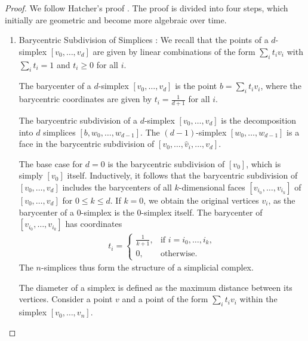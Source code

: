 \begin{proof}
	We follow Hatcher's proof \cite[Proposition 2.21]{hatcher2005algebraic}. The proof is divided into four steps, which initially are geometric and become more algebraic over time.
	
	\begin{enumerate}
	\item Barycentric Subdivision of Simplices \cite[\S 2.21 (1)]{hatcher2005algebraic}: We recall that the points of a $d$-simplex $[v_0, \ldots, v_d]$ are given by linear combinations of the form $\sum_{i} t_i v_i$ with $\sum_i t_i = 1$ and $t_i \geq 0$ for all $i$.
			
	\begin{definition}[Barycenter]
		The barycenter of a $d$-simplex $[v_0, \ldots, v_d]$ is the point $b = \sum_i t_i v_i$, where the barycentric coordinates are given by $t_i = \frac{1}{d+1}$ for all $i$.
	\end{definition}
			
	\begin{definition}
		The barycentric subdivision of a $d$-simplex $[v_0, \ldots, v_d]$ is the decomposition into $d$ simplices $[b, w_0, \ldots, w_{d-1}]$. The $(d-1)$-simplex $[w_0, \ldots, w_{d-1}]$ is a face in the barycentric subdivision of $[v_0, \ldots, \hat{v}_i, \ldots, v_d]$.
	\end{definition}
			
	The base case for $d=0$ is the barycentric subdivision of $[v_0]$, which is simply $[v_0]$ itself. Inductively, it follows that the barycentric subdivision of $[v_0, \ldots, v_d]$ includes the barycenters of all $k$-dimensional faces $[v_{i_0}, \ldots, v_{i_k}]$ of $[v_0, \ldots, v_d]$ for $0 \leq k \leq d$. If $k=0$, we obtain the original vertices $v_i$, as the barycenter of a $0$-simplex is the $0$-simplex itself. The barycenter of $[v_{i_0}, \ldots, v_{i_k}]$ has coordinates
	\begin{align}
		t_i = \begin{cases}
		\frac{1}{k+1}, & \text{if } i = i_0, \ldots, i_k, \\
		0,             & \text{otherwise}.                
		\end{cases}
	\end{align}
	The \(n\)-simplices thus form the structure of a simplicial complex.
			
	The diameter of a simplex is defined as the maximum distance between its vertices. Consider a point \(v\) and a point of the form \(\sum_i t_i v_i\) within the simplex \([v_0, \ldots, v_n]\).
	

\end{enumerate}
\end{proof}
